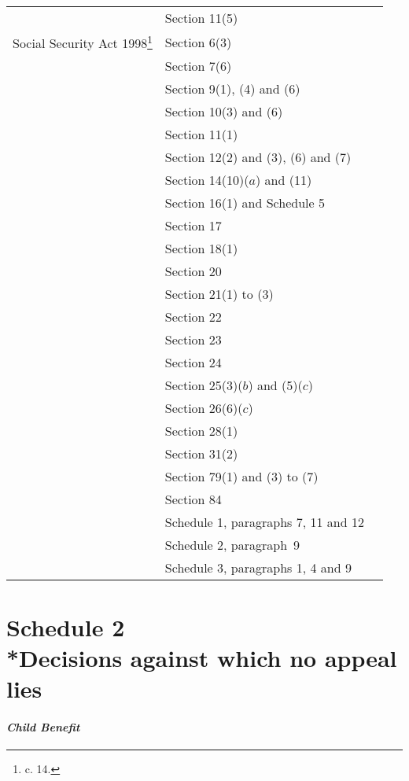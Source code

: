 \documentclass[12pt,a4paper]{article}
\begin{document}
{\begin{longtable}{p{150pt}p{102pt}p{102pt}}
&Section 11(5)\\
Social Security Act 1998\footnote{\frenchspacing 1998 c. 14.}&Section 6(3)\\
&Section 7(6)\\
&Section 9(1), (4) and (6)\\
&Section 10(3) and (6)\\
&Section 11(1)\\
&Section 12(2) and (3), (6) and (7)\\
&Section 14(10)($a$) and (11)\\
&Section 16(1) and Schedule 5\\
&Section 17\\
&Section 18(1)\\
&Section 20\\
&Section 21(1) to (3)\\
&Section 22\\
&Section 23\\
&Section 24\\
&Section 25(3)($b$) and (5)($c$)\\
&Section 26(6)($c$)\\
&Section 28(1)\\
&Section 31(2)\\
&Section 79(1) and (3) to (7)\\
&Section 84\\
&Schedule 1, paragraphs 7, 11 and 12\\
&Schedule 2, paragraph~9\\
&Schedule 3, paragraphs 1, 4 and 9\\
\end{longtable}

}

\vfill

\part[Schedule 2 --- Decisions against which no appeal lies]{Schedule 2\\*Decisions against which no appeal lies}

\renewcommand\parthead{--- Schedule 2}


\subsection*{\itshape Child Benefit}
\end{document}
